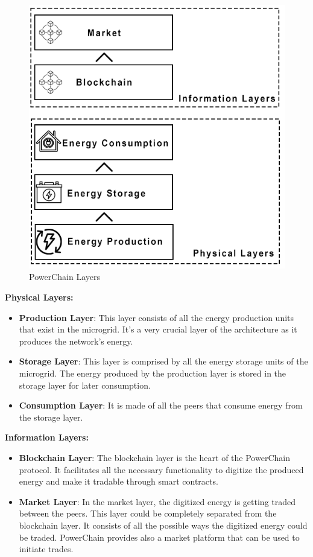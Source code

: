 \begin{figure}[h!]
    \centering
    \includegraphics[scale=0.6]{Figures/PowerChain_Layers.png}
    \caption{PowerChain Layers}
\end{figure}

\textbf{Physical Layers:}
\begin{itemize}
    \item \textbf{Production Layer}: This layer consists of all the energy production units that exist in the microgrid. It's a very crucial layer of the architecture as it
          produces the network's energy.
    \item \textbf{Storage Layer}: This layer is comprised by all the energy storage units of the microgrid. The energy produced by the production layer is stored in the storage
          layer for later consumption.
    \item \textbf{Consumption Layer}: It is made of all the peers that consume energy from the storage layer.
\end{itemize}

\textbf{Information Layers:}
\begin{itemize}
    \item \textbf{Blockchain Layer}: The blockchain layer is the heart of the PowerChain protocol. It facilitates all the necessary functionality to digitize the produced energy and
          make it tradable through smart contracts.
    \item \textbf{Market Layer}: In the market layer, the digitized energy is getting traded between the peers. This layer could be completely separated from the blockchain layer. It consists
          of all the possible ways the digitized energy could be traded. PowerChain provides also a market platform that can be used to initiate trades.
\end{itemize}


